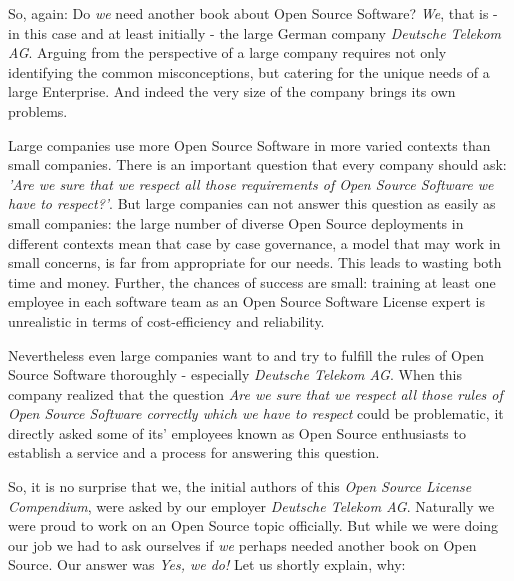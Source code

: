 So, again: Do \emph{we} need another book about Open Source Software? \emph{We},
that is - in this case and at least initially - the large German company
\textit{Deutsche Telekom AG}. Arguing from the perspective of a large company
requires not only identifying the common misconceptions, but catering for the
unique needs of a large Enterprise. And indeed the very size of the company
brings its own problems.

Large companies use more Open Source Software in more varied contexts than small
companies. There is an important question that every company should ask:
\emph{'Are we sure that we respect all those requirements of Open Source
Software we have to respect?'}. But large companies can not answer this question
as easily as small companies: the large number of diverse Open Source
deployments in different contexts mean that case by case governance, a model
that may work in small concerns, is far from appropriate for our needs. This
leads to wasting both time and money. Further, the chances of success are small:
training at least one employee in each software team as an Open Source Software
License expert is unrealistic in terms of cost-efficiency and reliability.

Nevertheless even large companies want to and try to fulfill the rules of Open
Source Software thoroughly - especially \emph{Deutsche Telekom AG}. When this
company realized that the question \textit{Are we sure that we respect all those
rules of Open Source Software correctly which we have to respect} could be
problematic, it directly asked some of its' employees known as Open Source
enthusiasts to establish a service and a process for answering this question.

So, it is no surprise that we, the initial authors of this \textit{Open Source
License Compendium}, were asked by our employer \emph{Deutsche Telekom AG}.
Naturally we were proud to work on an Open Source topic officially. But while we
were doing our job we had to ask ourselves if \emph{we} perhaps needed another
book on Open Source. Our answer was \textit{Yes, we do!} Let us shortly explain,
why:

